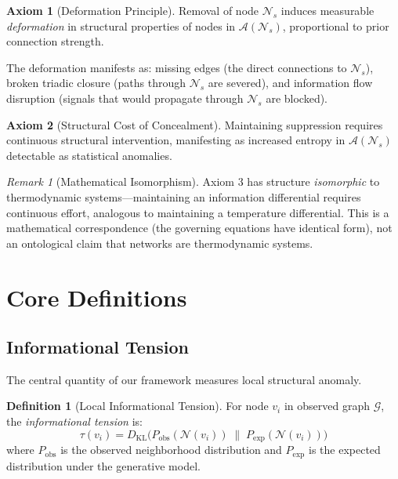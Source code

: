 \documentclass[11pt,a4paper]{article}
\theoremstyle{definition}
\newtheorem{axiom}{Axiom}
\newtheorem{definition}{Definition}[section]
\theoremstyle{remark}
\newtheorem{remark}{Remark}[section]
\newcommand{\NS}{\mathcal{N}_s}
\newcommand{\CA}{\mathcal{A}}
\newcommand{\Dkl}{D_{\mathrm{KL}}}
\newcommand{\Graph}{\mathcal{G}}
\begin{document}
\begin{axiom}[Deformation Principle]
\label{ax:deformation}
Removal of node $\NS$ induces measurable \emph{deformation} in structural properties of nodes in $\CA(\NS)$, proportional to prior connection strength.
\end{axiom}

The deformation manifests as: missing edges (the direct connections to $\NS$), broken triadic closure (paths through $\NS$ are severed), and information flow disruption (signals that would propagate through $\NS$ are blocked).

\begin{axiom}[Structural Cost of Concealment]
\label{ax:structural-cost}
Maintaining suppression requires continuous structural intervention, manifesting as increased entropy in $\CA(\NS)$ detectable as statistical anomalies.
\end{axiom}

\begin{remark}[Mathematical Isomorphism]
Axiom 3 has structure \emph{isomorphic} to thermodynamic systems---maintaining an information differential requires continuous effort, analogous to maintaining a temperature differential. This is a mathematical correspondence (the governing equations have identical form), not an ontological claim that networks are thermodynamic systems.
\end{remark}

\section{Core Definitions}

\subsection{Informational Tension}

The central quantity of our framework measures local structural anomaly.

\begin{definition}[Local Informational Tension]
\label{def:tension}
For node $v_i$ in observed graph $\Graph$, the \emph{informational tension} is:
\begin{equation}
    \boxed{
    \tau(v_i) = \Dkl\Big( P_{\text{obs}}(\mathcal{N}(v_i)) \;\Big\|\; P_{\text{exp}}(\mathcal{N}(v_i)) \Big)
    }
\end{equation}
where $P_{\text{obs}}$ is the observed neighborhood distribution and $P_{\text{exp}}$ is the expected distribution under the generative model.
\end{definition}
\end{document}
